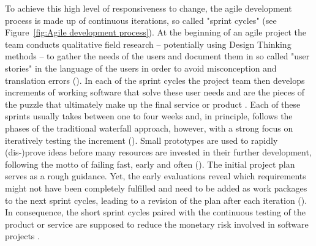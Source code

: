To achieve this high level of responsiveness to change, the agile development process is made up of continuous iterations, so called "sprint cycles" (see Figure~\ref{fig:Agile development process}). At the beginning of an agile project the team conducts qualitative field research – potentially using Design Thinking methods – to gather the needs of the users and document them in so called "user stories" in the language of the users in order to avoid misconception and translation errors (\cite{Wirdemann2017, Mergel2016}). In each of the sprint cycles the project team then develops increments of working software that solve these user needs and are the pieces of the puzzle that ultimately make up the final service or product \parencite{Schwaber2020}. Each of these sprints usually takes between one to four weeks and, in principle, follows the phases of the traditional waterfall approach, however, with a strong focus on iteratively testing the increment (\cite{Schwaber2020, Hughes2013}). Small prototypes are used to rapidly (dis-)prove ideas before many resources are invested in their further development, following the motto of failing fast, early and often (\cite{Mergel2016, Boehmer2017}). The initial project plan serves as a rough guidance. Yet, the early evaluations reveal which requirements might not have been completely fulfilled and need to be added as work packages to the next sprint cycles, leading to a revision of the plan after each iteration (\cite{Mergel2016}). In consequence, the short sprint cycles paired with the continuous testing of the product or service are supposed to reduce the monetary risk involved in software projects \parencite{Schwaber2020}.


